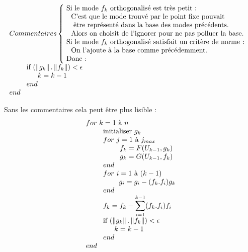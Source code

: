 \begin{equation}{}
\begin{array}{l}
 Commentaires
 \left\{\!
	 \begin{array}{l}
	 $Si le mode $f_k$ orthogonalisé est très petit : $\\
	 ~~$C'est que le mode trouvé par le point fixe pouvait $\\
	 ~~~$être représenté dans la base des modes précédents. $\\
	 ~~$Alors on choisit de l'ignorer pour ne pas polluer la base.$\\
	 $Si le mode $f_k$ orthogonalisé satisfait un critère de norme : $\\
	 ~~$On l'ajoute à la base comme précédemment.$\\
	 $Donc :$\\
	 \end{array}
 \right.
 \\
 \phantom{for~k} $if $ \left( \left\Vert g_k  \right\Vert . 
 						\left\Vert f_k  \right\Vert \right)
 						< \epsilon\\
 \phantom{for~k end} k = k-1 \\
 \phantom{for~k} end\\
end
\end{array}  \\
\end{equation}

Sans les commentaires cela peut être plus lisible :
\begin{equation}{}
\begin{array}{l}
 for~k = 1$ à $ n \\
 \phantom{for~k} $initialiser $g_k \\
 \phantom{for~k} for~j=1$ à $j_{max} \\
 \phantom{for~k for~j } f_k = F (U_{k-1},g_k) \\
 \phantom{for~k for~j } g_k = G (U_{k-1},f_k) \\
 \phantom{for~k} end \\ 
 \phantom{for~k} for~i=1$ à $(k-1) \\
 \phantom{for~k for~i } g_i = g_i - (f_k.f_i)g_k\\
 \phantom{for~k} end\\
 \displaystyle
 \phantom{for~k} f_k = f_k - \sum_{i=1}^{k-1} (f_k.f_i)f_i\\
 \phantom{for~k} $if $ \left( \left\Vert g_k  \right\Vert . 
 						\left\Vert f_k  \right\Vert \right)
 						< \epsilon\\
 \phantom{for~k end} k = k-1 \\
 \phantom{for~k} end\\
end
\end{array}  \\
\end{equation}
